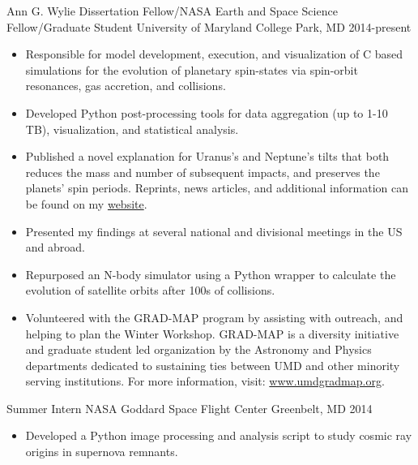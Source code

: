 \documentclass[]{awesome-cv}
\begin{document}
\begin{cventries}
	\cventry
	{Ann G. Wylie Dissertation Fellow/{\color{red}NASA Earth and Space Science Fellow}/Graduate Student}
	{University of Maryland}
	{College Park, MD}
	{2014-present}
	{\vspace{-3mm}
		\begin{itemize}
			\item Responsible for model development, execution, and visualization of C based simulations for the evolution of planetary spin-states via spin-orbit resonances, gas accretion, and collisions. \vspace{0.7mm}
			\item Developed Python post-processing tools for data aggregation (up to 1-10 TB), visualization, and statistical analysis. \vspace{0.7mm}
			\item Published a novel explanation for Uranus's and Neptune's tilts that both reduces the mass and number of subsequent impacts, and preserves the planets' spin periods. Reprints, news articles, and additional information can be found on my \href{https://www.astro.umd.edu/~zero/}{website}. \vspace{0.7mm}
			\item Presented my findings at several national and divisional meetings in the US and abroad. \vspace{0.7mm}
			\item Repurposed an N-body simulator using a Python wrapper to calculate the evolution of satellite orbits after 100s of collisions. \vspace{0.7mm}
			\item Volunteered with the GRAD-MAP program by assisting with outreach, and helping to plan the Winter Workshop. GRAD-MAP is a diversity initiative and graduate student led organization by the Astronomy and Physics departments dedicated to sustaining ties between UMD and other minority serving institutions. For more information, visit: \href{https://www.umdgradmap.org/}{www.umdgradmap.org}. \vspace{0.7mm}
		\end{itemize}
	}

	\vspace{-6mm}
	\cventry
	{Summer Intern}
	{NASA Goddard Space Flight Center}
	{Greenbelt, MD}
	{2014}
	{\vspace{-3mm}
		\begin{itemize}
			\item Developed a Python image processing and analysis script to study cosmic ray origins in supernova remnants. 
	\end{itemize}
	}
	

\end{cventries}
\end{document}
